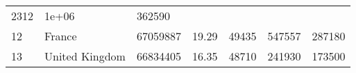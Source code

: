 \documentclass[
]{article}
\begin{document}
\begin{longtable}[]{@{}lllllll@{}}
\begin{minipage}[t]{0.09\columnwidth}
2312\strut
\end{minipage} & \begin{minipage}[t]{0.12\columnwidth}\raggedright
1e+06\strut
\end{minipage} & \begin{minipage}[t]{0.12\columnwidth}\raggedright
362590\strut
\end{minipage}\tabularnewline
\begin{minipage}[t]{0.06\columnwidth}\raggedright
12\strut
\end{minipage} & \begin{minipage}[t]{0.15\columnwidth}\raggedright
France\strut
\end{minipage} & \begin{minipage}[t]{0.13\columnwidth}\raggedright
67059887\strut
\end{minipage} & \begin{minipage}[t]{0.13\columnwidth}\raggedright
19.29\strut
\end{minipage} & \begin{minipage}[t]{0.09\columnwidth}\raggedright
49435\strut
\end{minipage} & \begin{minipage}[t]{0.12\columnwidth}\raggedright
547557\strut
\end{minipage} & \begin{minipage}[t]{0.12\columnwidth}\raggedright
287180\strut
\end{minipage}\tabularnewline
\begin{minipage}[t]{0.06\columnwidth}\raggedright
13\strut
\end{minipage} & \begin{minipage}[t]{0.15\columnwidth}\raggedright
United Kingdom\strut
\end{minipage} & \begin{minipage}[t]{0.13\columnwidth}\raggedright
66834405\strut
\end{minipage} & \begin{minipage}[t]{0.13\columnwidth}\raggedright
16.35\strut
\end{minipage} & \begin{minipage}[t]{0.09\columnwidth}\raggedright
48710\strut
\end{minipage} & \begin{minipage}[t]{0.12\columnwidth}\raggedright
241930\strut
\end{minipage} & \begin{minipage}[t]{0.12\columnwidth}\raggedright
173500\strut
\end{minipage}\tabularnewline

\end{longtable}
\end{document}
